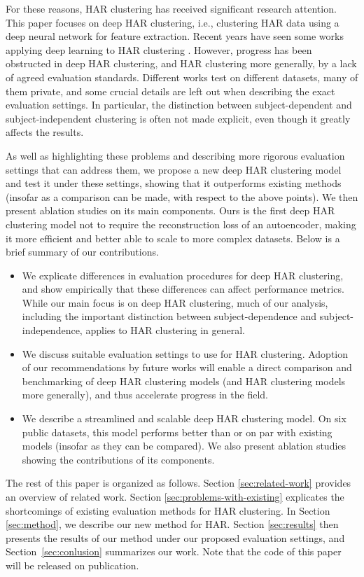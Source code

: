 \documentclass[wcp]{jmlr}
\begin{document}
For these reasons, HAR clustering has received significant research attention. This paper focuses on deep HAR clustering, i.e., clustering HAR data using a deep neural network for feature extraction. Recent years have seen some works applying deep learning to HAR clustering \citep{mcconville2021n2d,sheng2020unsupervised,ma2021unsupervised}. However, progress has been obstructed in deep HAR clustering, and HAR clustering more generally, by a lack of agreed evaluation standards. Different works test on different datasets, many of them private, and some crucial details are left out when describing the exact evaluation settings. In particular, the distinction between subject-dependent and subject-independent clustering is often not made explicit, even though it greatly affects the results. 


As well as highlighting these problems and describing more rigorous evaluation settings that can address them, we propose a new deep HAR clustering model and test it under these settings, showing that it outperforms existing methods (insofar as a comparison can be made, with respect to the above points). We then present ablation studies on its main components. 
Ours is the first deep HAR clustering model not to require the reconstruction loss of an autoencoder, making it more efficient and better able to scale to more complex datasets. 
Below is a brief summary of our contributions. 
\begin{itemize}
    \item We explicate differences in evaluation procedures for deep HAR clustering, and show empirically that these differences can affect performance metrics. While our main focus is on deep HAR clustering, much of our analysis, including the important distinction between subject-dependence and subject-independence, applies to HAR clustering in general.
    \item We discuss suitable evaluation settings to use for HAR clustering. Adoption of our recommendations by future works will enable a direct comparison and benchmarking of deep HAR clustering models (and HAR clustering models more generally), and thus accelerate progress in the field. 
    \item We describe a streamlined and scalable deep HAR clustering model. On six public datasets, this model performs better than or on par with existing models (insofar as they can be compared). We also present ablation studies showing the contributions of its components. 
\end{itemize}
The rest of this paper is organized as follows. Section \ref{sec:related-work} provides an overview of related work. Section \ref{sec:problems-with-existing} explicates the short\-comings of existing evaluation methods for HAR clustering. In Section \ref{sec:method}, we describe our new method for HAR. Section \ref{sec:results} then presents the results of our method under our proposed evaluation settings, and Section~\ref{sec:conlusion} summarizes our work.
Note that the code of this paper will be released on publication.
\end{document}
